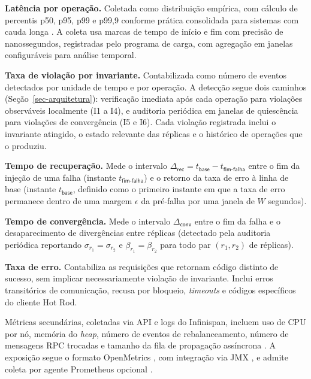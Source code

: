 \textbf{Latência por operação.} Coletada como distribuição empírica, com cálculo de percentis p50, p95, p99 e p99,9 conforme prática consolidada para sistemas com cauda longa \citep{dean_barroso_tail_2013, google_sre_slo}. A coleta usa marcas de tempo de início e fim com precisão de nanossegundos, registradas pelo programa de carga, com agregação em janelas configuráveis para análise temporal.

\textbf{Taxa de violação por invariante.} Contabilizada como número de eventos detectados por unidade de tempo e por operação. A detecção segue dois caminhos (Seção~\ref{sec-arquitetura}): verificação imediata após cada operação para violações observáveis localmente (I1 a I4), e auditoria periódica em janelas de quiescência para violações de convergência (I5 e I6). Cada violação registrada inclui o invariante atingido, o estado relevante das réplicas e o histórico de operações que o produziu. 

\textbf{Tempo de recuperação.} Mede o intervalo $\Delta_\textsf{rec} = t_\textsf{base} - t_\textsf{fim-falha}$ entre o fim da injeção de uma falha (instante $t_\textsf{fim-falha}$) e o retorno da taxa de erro à linha de base (instante $t_\textsf{base}$, definido como o primeiro instante em que a taxa de erro permanece dentro de uma margem $\epsilon$ da pré-falha por uma janela de $W$ segundos).

\textbf{Tempo de convergência.} Mede o intervalo $\Delta_\textsf{conv}$ entre o fim da falha e o desaparecimento de divergências entre réplicas (detectado pela auditoria periódica reportando $\sigma_{r_1} = \sigma_{r_2}$ e $\beta_{r_1} = \beta_{r_2}$ para todo par $(r_1, r_2)$ de réplicas). 

\textbf{Taxa de erro.} Contabiliza as requisições que retornam código distinto de sucesso, sem implicar necessariamente violação de invariante. Inclui erros transitórios de comunicação, recusa por bloqueio, \emph{timeouts} e códigos específicos do cliente Hot Rod.

Métricas secundárias, coletadas via API e logs do Infinispan, incluem uso de CPU por nó, memória do \emph{heap}, número de eventos de rebalanceamento, número de mensagens RPC trocadas e tamanho da fila de propagação assíncrona \citep{infinispan_metrics}. A exposição segue o formato OpenMetrics \citep{openmetrics_spec}, com integração via JMX \citep{jmx_oracle}, e admite coleta por agente Prometheus opcional \citep{prometheus_docs}. 

